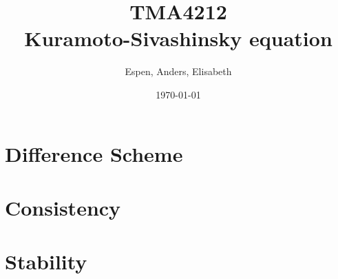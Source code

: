 \documentclass[16pt]{article}
\title{TMA4212 \\ Kuramoto-Sivashinsky equation}
\author{Espen, Anders, Elisabeth}
\date{\today}
\begin{document}
\huge





\section*{Difference Scheme}


\section*{Consistency}


\section*{Stability}

\end{document}
